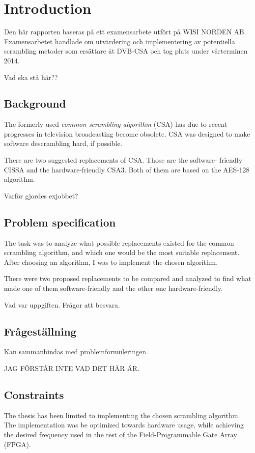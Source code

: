 \chapter{Introduction}
Den här rapporten baseras på ett examensarbete utfört på WISI NORDEN 
AB. Examensarbetet handlade om utvärdering och implementering av 
potentiella scrambling metoder som ersättare åt DVB-CSA och tog plats 
under vårterminen 2014.

Vad ska stå här??

\section{Background}
The formerly used \emph{common scrambling algorithm} (CSA) has due to 
recent progresses in television broadcasting become obsolete. CSA was 
designed to make software descrambling hard, if possible.



There are two suggested replacements of CSA. Those are the software-
friendly CISSA and the hardware-friendly CSA3. Both of them are based 
on the AES-128 algorithm.

Varför gjordes exjobbet?


\section{Problem specification}
The task was to analyze what possible replacements existed for the 
common scrambling algorithm, and which one would be the most suitable 
replacement. 
After choosing an algorithm, I was to implement the chosen algorithm.

There were two proposed replacements to be compared and analyzed 
to find what made one of them software-friendly and the other one 
hardware-friendly.

Vad var uppgiften. Frågor att besvara.


\section{Frågeställning}
Kan sammanbindas med problemformuleringen.

JAG FÖRSTÅR INTE VAD DET HÄR ÄR.

\section{Constraints}
The thesis has been limited to implementing the chosen scrambling 
algorithm. The implementation was be optimized towards hardware usage, 
while achieving the desired frequency used in the rest of the 
Field-Programmable Gate Array (FPGA).


